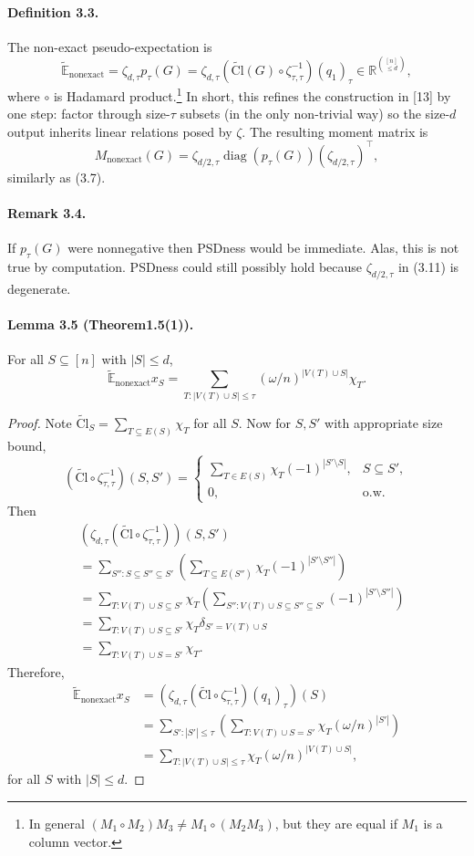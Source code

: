 \paragraph{Definition 3.3.} The non-exact pseudo-expectation is
\[\widetilde{\mathbb E}_{\mathrm{nonexact}}=\zeta_{d,\tau}p_\tau(G)=\zeta_{d,\tau}\left(\widetilde{\mathrm{Cl}}(G)\circ\zeta_{\tau,\tau}^{-1}\right)(q_1)_\tau\in\mathbb R^{\binom{[n]}{\le d}},\tag{3.10}\]
where $\circ$ is Hadamard product.\footnote{In general $(M_1\circ M_2)M_3\ne M_1\circ(M_2M_3)$, but they are equal if $M_1$ is a column vector.} In short, this refines the construction in [13] by one step: factor through size-$\tau$ subsets (in the only non-trivial way) so the size-$d$ output inherits linear relations posed by $\zeta$. The resulting moment matrix is
\[M_{\mathrm{nonexact}}(G)=\zeta_{d/2,\tau}\operatorname{diag}(p_\tau(G))(\zeta_{d/2,\tau})^\top,\tag{3.11}\]
similarly as (3.7).
\paragraph{Remark 3.4.} If $p_\tau(G)$ were nonnegative then PSDness would be immediate. Alas, this is not true by computation. PSDness could still possibly hold because $\zeta_{d/2,\tau}$ in (3.11) is degenerate.
\paragraph{Lemma 3.5 (Theorem1.5(1)).} For all $S\subseteq[n]$ with $|S|\le d$,
\[\widetilde{\mathbb E}_{\mathrm{nonexact}}x_S=\sum_{T:|V(T)\cup S|\le\tau}(\omega/n)^{|V(T)\cup S|}\chi_T.\tag{3.12}\]
\begin{proof}Note $\widetilde{\mathrm{Cl}}_S=\sum_{T\subseteq E(S)}\chi_T$ for all $S$. Now for $S,S'$ with appropriate size bound,
\[\left(\widetilde{\mathrm{Cl}}\circ\zeta_{\tau,\tau}^{-1}\right)(S,S')=\begin{cases}\sum_{T\in E(S)}\chi_T(-1)^{|S'\setminus S|},&S\subseteq S',\\0,&\text{o.w.}\end{cases}\]
Then
\begin{align*}&\left(\zeta_{d,\tau}(\widetilde{\mathrm{Cl}}\circ\zeta_{\tau,\tau}^{-1})\right)(S,S')\\&=\sum_{S'':S\subseteq S''\subseteq S'}\left(\sum_{T\subseteq E(S'')}\chi_T(-1)^{|S'\setminus S''|}\right)\\&=\sum_{T:V(T)\cup S\subseteq S'}\chi_T\left(\sum_{S'':V(T)\cup S\subseteq S''\subseteq S'}(-1)^{|S'\setminus S''|}\right)\\&=\sum_{T:V(T)\cup S\subseteq S'}\chi_T\delta_{S'=V(T)\cup S}\\&=\sum_{T:V(T)\cup S=S'}\chi_T.\end{align*}
Therefore,
\begin{align*}\widetilde{\mathbb E}_{\mathrm{nonexact}}x_S&=\left(\zeta_{d,\tau}(\widetilde{\mathrm{Cl}}\circ\zeta_{\tau,\tau}^{-1})(q_1)_\tau\right)(S)\\&=\sum_{S':|S'|\le\tau}\left(\sum_{T:V(T)\cup S=S'}\chi_T(\omega/n)^{|S'|}\right)\\&=\sum_{T:|V(T)\cup S|\le\tau}\chi_T(\omega/n)^{|V(T)\cup S|},\end{align*}
for all $S$ with $|S|\le d$.\end{proof}
